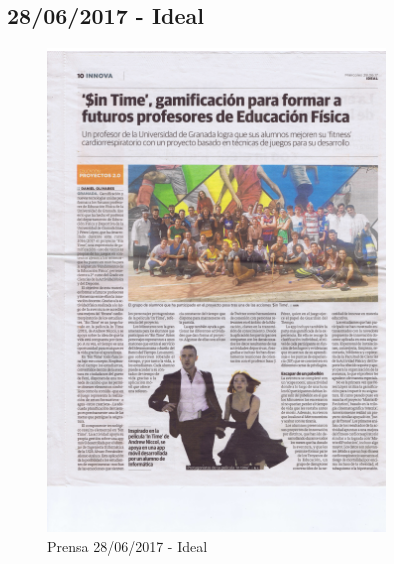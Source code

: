 \subsection{28/06/2017 - Ideal}
\begin{figure}[ht]
	\centering
	\includegraphics[width=0.8\textwidth]{prensa/IDEAL_28_06_2017_b.png}
	\caption{Prensa 28/06/2017 - Ideal}
	\label{prensa2}
\end{figure}

\newpage

